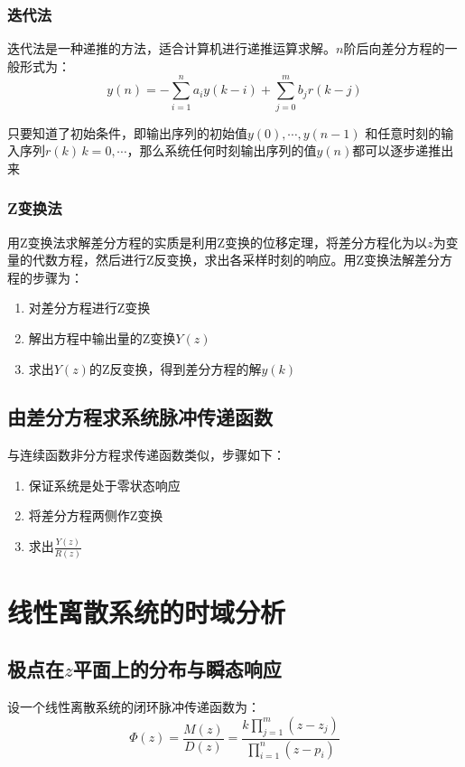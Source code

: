 \subsubsection{迭代法}
迭代法是一种递推的方法，适合计算机进行递推运算求解。$n$阶后向差分方程的一般形式为：
\begin{equation*}
    y(n) = -\sum_{i=1}^n a_i y(k-i) + \sum_{j=0}^m b_j r(k-j)
\end{equation*}

只要知道了初始条件，即输出序列的初始值$y(0),\cdots , y(n-1)$ 和任意时刻的输入序列$r(k)\,k=0,\cdots$，那么系统任何时刻输出序列的值$y(n)$都可以逐步递推出来

\subsubsection{Z变换法}
用Z变换法求解差分方程的实质是利用Z变换的位移定理，将差分方程化为以$z$为变量的代数方程，然后进行Z反变换，求出各采样时刻的响应。用Z变换法解差分方程的步骤为：
\begin{enumerate}
    \item 对差分方程进行Z变换
    \item 解出方程中输出量的Z变换$Y(z)$
    \item 求出$Y(z)$的Z反变换，得到差分方程的解$y(k)$
\end{enumerate}

\subsection{由差分方程求系统脉冲传递函数}
与连续函数非分方程求传递函数类似，步骤如下：
\begin{enumerate}
    \item 保证系统是处于零状态响应
    \item 将差分方程两侧作Z变换
    \item 求出$\frac{Y(z)}{R(z)}$
\end{enumerate}

\section{线性离散系统的时域分析}

\subsection{极点在$z$平面上的分布与瞬态响应}

设一个线性离散系统的闭环脉冲传递函数为：
\begin{equation*}
    \Phi (z) = \frac{M(z)}{D(z)} = \frac{k\prod\limits_{j=1}^m (z-z_j)}{\prod\limits_{i=1}^n (z-p_i)}
\end{equation*}

